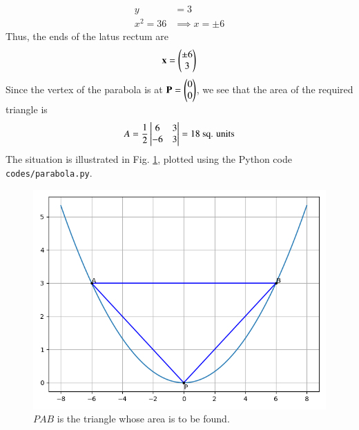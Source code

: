 \documentclass[journal,12pt,twocolumn]{IEEEtran}
\renewcommand{\vec}[1]{\boldsymbol{\mathbf{#1}}}
\begin{document}
\begin{enumerate}
    \begin{align}
        y &= 3 \\
        x^2 = 36 &\implies x = \pm 6
    \end{align}
    Thus, the ends of the latus rectum are
    \begin{align}
        \vec{x} = \myvec{\pm 6\\3}
    \end{align}
    Since the vertex of the parabola is at $\vec{P} = \myvec{0\\0}$,
    we see that the area of the required triangle is
    \begin{align}
        A = \frac{1}{2}\begin{vmatrix}6&3\\-6&3\end{vmatrix} = 18\ \textrm{sq. units}
    \end{align}
    The situation is illustrated in Fig. \ref{fig:parabola}, plotted using the
    Python code \texttt{codes/parabola.py}.
    \begin{figure}[!ht]
        \centering
        \includegraphics[width=\columnwidth]{figs/parabola.png}
        \caption{$PAB$ is the triangle whose area is to be found.}
        \label{fig:parabola}
    \end{figure}
\end{enumerate}
\end{document}
